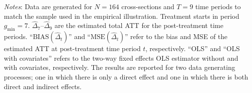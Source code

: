 \documentclass[12pt,fleqn]{article}
\begin{document}
\begin{table}
\begin{center}
\begin{adjustbox}{max width=\textwidth}
\begin{threeparttable}
    \begin{tablenotes}[flushleft] \footnotesize
    \item \textit{Notes}: Data are generated for $N=164$ cross-sections and $T=9$ time periods to match the sample used in the empirical illustration. Treatment starts in period $g_{\min} = 7$. $\widehat{\Delta}_7$--$\widehat{\Delta}_9$ are the estimated total ATT for the post-treatment time periods. ``$\text{BIAS}(\widehat{\Delta}_t)$'' and ``$\text{MSE}(\widehat{\Delta}_t)$'' refer to the bias and MSE of the estimated ATT at post-treatment time period $t$, respectively. ``OLS'' and ``OLS with covariates'' refers to the two-way fixed effects OLS estimator without and with covariates, respectively. The results are reported for two data generating processes; one in which there is only a direct effect and one in which there is both direct and indirect effects.
    \end{tablenotes}
\end{threeparttable}
\end{adjustbox}
\end{center}
\end{table}
\end{document}
